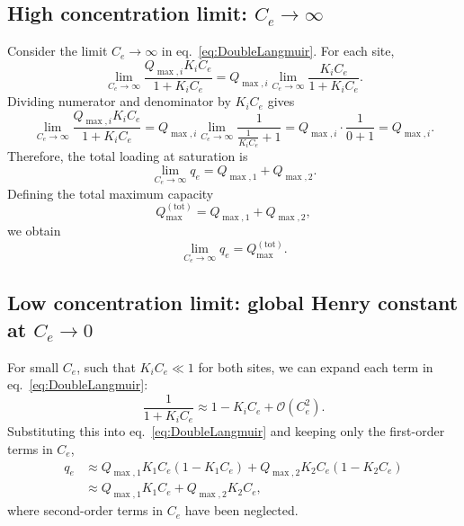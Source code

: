 	\subsection{High concentration limit: \(C_e \to \infty\)}
	
	Consider the limit \(C_e \to \infty\) in eq.~\eqref{eq:DoubleLangmuir}.
	For each site,
	\begin{equation}
		\lim_{C_e \to \infty} \frac{Q_{\max,i} K_i C_e}{1 + K_i C_e}
		= Q_{\max,i} \lim_{C_e \to \infty}
		\frac{K_i C_e}{1 + K_i C_e}.
	\end{equation}
	Dividing numerator and denominator by \(K_i C_e\) gives
	\begin{equation}
		\lim_{C_e \to \infty} \frac{Q_{\max,i} K_i C_e}{1 + K_i C_e}
		= Q_{\max,i} \lim_{C_e \to \infty}
		\frac{1}{\frac{1}{K_i C_e} + 1}
		= Q_{\max,i} \cdot \frac{1}{0 + 1}
		= Q_{\max,i}.
	\end{equation}
	Therefore, the total loading at saturation is
	\begin{equation}
		\lim_{C_e \to \infty} q_e
		= Q_{\max,1} + Q_{\max,2}.
	\end{equation}
	Defining the total maximum capacity
	\begin{equation}
		Q_{\max}^{\mathrm{(tot)}} = Q_{\max,1} + Q_{\max,2},
	\end{equation}
	we obtain
	\begin{equation}
		\boxed{\displaystyle \lim_{C_e \to \infty} q_e
			= Q_{\max}^{\mathrm{(tot)}}.}
	\end{equation}
	
	\subsection{Low concentration limit: global Henry constant at \(C_e \to 0\)}
	
	For small \(C_e\), such that \(K_i C_e \ll 1\) for both sites,
	we can expand each term in eq.~\eqref{eq:DoubleLangmuir}:
	\begin{equation}
		\frac{1}{1 + K_i C_e}
		\approx 1 - K_i C_e + \mathcal{O}(C_e^2).
	\end{equation}
	Substituting this into eq.~\eqref{eq:DoubleLangmuir} and keeping only
	the first-order terms in \(C_e\),
	\begin{align}
		q_e
		&\approx Q_{\max,1} K_1 C_e (1 - K_1 C_e)
		+ Q_{\max,2} K_2 C_e (1 - K_2 C_e) \\
		&\approx Q_{\max,1} K_1 C_e + Q_{\max,2} K_2 C_e,
	\end{align}
	where second-order terms in \(C_e\) have been neglected.
	

